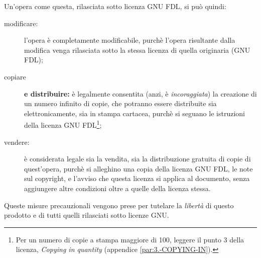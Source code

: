 Un'opera come questa, rilasciata sotto licenza GNU FDL, si può quindi:

\begin{description}
	\item [{modificare:}] l'opera è completamente modificabile, purchè l'opera risultante dalla modifica venga rilasciata sotto la stessa licenza di quella originaria (GNU FDL);
	\item [{copiare}] \textbf{e distribuire:} è legalmente consentita (anzi, è \emph{incoraggiata}) la creazione di un numero infinito di copie, che potranno essere distribuite sia elettronicamente, sia in stampa cartacea, purchè si seguano le istruzioni della licenza GNU FDL\footnote{Per un numero di copie a stampa maggiore di 100, leggere il punto 3 della licenza, \emph{Copying in quantity} (appendice \ref{par:3.-COPYING-IN}).};
	\item [{vendere:}] è considerata legale sia la vendita, sia la distribuzione gratuita di copie di quest'opera, purchè si alleghino una copia della licenza GNU FDL, le note sul copyright, e l'avviso che questa licenza si applica al documento, senza aggiungere altre condizioni oltre a quelle della licenza stessa.
\end{description}

Queste misure precauzionali vengono prese per tutelare la \emph{libertà} di questo prodotto e di tutti quelli rilasciati sotto licenze GNU.


